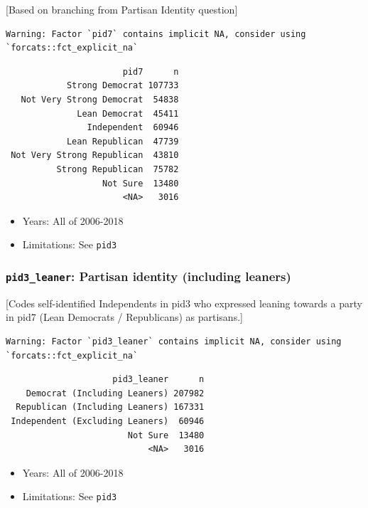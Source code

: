 \documentclass[10pt,article,oneside]{memoir}
\theoremstyle{definition}
\begin{document}
{[}Based on branching from Partisan Identity question{]}

\begin{verbatim}
Warning: Factor `pid7` contains implicit NA, consider using
`forcats::fct_explicit_na`
\end{verbatim}

\begin{verbatim}
                       pid7      n
            Strong Democrat 107733
   Not Very Strong Democrat  54838
              Lean Democrat  45411
                Independent  60946
            Lean Republican  47739
 Not Very Strong Republican  43810
          Strong Republican  75782
                   Not Sure  13480
                       <NA>   3016
\end{verbatim}

\begin{itemize}
\tightlist
\item
  Years: All of 2006-2018
\item
  Limitations: See \texttt{pid3}
\end{itemize}

\hypertarget{pid3_leaner-partisan-identity-including-leaners}{%
\subsubsection{\texorpdfstring{\texttt{pid3\_leaner}: Partisan identity
(including
leaners)}{pid3\_leaner: Partisan identity (including leaners)}}\label{pid3_leaner-partisan-identity-including-leaners}}

{[}Codes self-identified Independents in pid3 who expressed leaning
towards a party in pid7 (Lean Democrats / Republicans) as partisans.{]}

\begin{verbatim}
Warning: Factor `pid3_leaner` contains implicit NA, consider using
`forcats::fct_explicit_na`
\end{verbatim}

\begin{verbatim}
                     pid3_leaner      n
    Democrat (Including Leaners) 207982
  Republican (Including Leaners) 167331
 Independent (Excluding Leaners)  60946
                        Not Sure  13480
                            <NA>   3016
\end{verbatim}

\begin{itemize}
\tightlist
\item
  Years: All of 2006-2018
\item
  Limitations: See \texttt{pid3}
\end{itemize}
\end{document}
